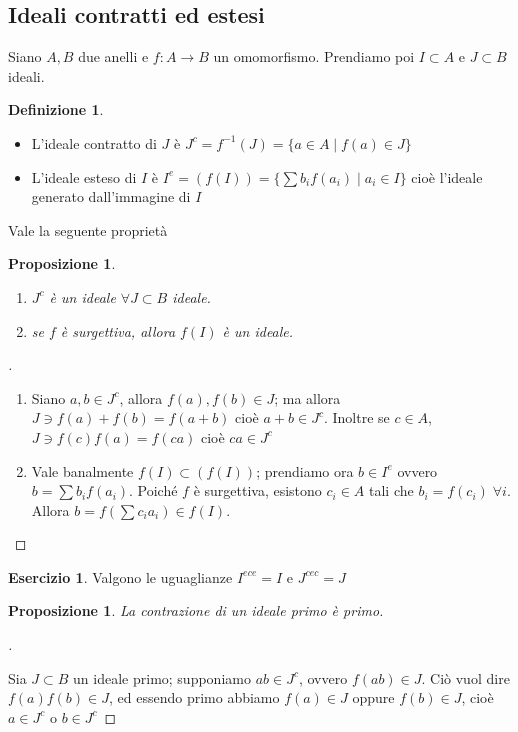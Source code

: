 \documentclass[a4paper,10pt]{article}
\theoremstyle{plain}
\newtheorem{prop}[thm]{Proposizione}
\theoremstyle{definition}
\newtheorem{defn}{Definizione}[section]
\newtheorem{es}{Esercizio}[section]
\newenvironment{myproof}[1][\proofname]{%
  \begin{proof}[#1]$ $\par\nobreak\ignorespaces
}{%
  \qedhere
  \end{proof}
}
\begin{document}
\subsection{Ideali contratti ed estesi}
Siano $A,B$ due anelli e $f:A\to B$ un omomorfismo. Prendiamo poi $I\subset A$ e $J\subset B$ ideali.\\
\begin{defn}
    $ $
    \begin{itemize}
        \item L'ideale contratto di $J$ è $J^c=f^{-1}(J)=\{ a\in A\mid f(a)\in J \}$
        \item L'ideale esteso di $I$ è $I^e=(f(I))=\{ \sum b_if(a_i)\mid a_i\in I \}$ cioè l'ideale generato dall'immagine di $I$
    \end{itemize}
\end{defn}

Vale la seguente proprietà
\begin{prop}
    $ $
    \begin{enumerate}
        \item $J^c$ è un ideale $\forall J\subset B$ ideale.
        \item se $f$ è surgettiva, allora $f(I)$ è un ideale.
    \end{enumerate}
\end{prop}
\begin{myproof}
    \begin{enumerate}
        \item Siano $a,b\in J^c$, allora $f(a),f(b)\in J$; ma allora $J\ni f(a)+f(b)=f(a+b)$ cioè $a+b\in J^c$. Inoltre se $c\in A$, $J\ni f(c)f(a)=f(ca)$ cioè $ca\in J^c$
        \item Vale banalmente $f(I)\subset (f(I))$; prendiamo ora $b\in I^e$ ovvero $b=\sum b_if(a_i)$. Poiché $f$ è surgettiva, esistono $c_i\in A$ tali che $b_i=f(c_i)\;\forall i$. Allora $b=f\left( \sum c_ia_i \right)\in f(I)$.
    \end{enumerate}
\end{myproof}

\begin{es}
    Valgono le uguaglianze $I^{ece}=I$ e $J^{cec}=J$
\end{es}

\begin{prop}
    La contrazione di un ideale primo è primo.
\end{prop}
\begin{myproof}
    Sia $J\subset B$ un ideale primo; supponiamo $ab\in J^c$, ovvero $f(ab)\in J$. Ciò vuol dire $f(a)f(b)\in J$, ed essendo primo abbiamo $f(a)\in J$ oppure $f(b)\in J$, cioè $a\in J^c$ o $b\in J^c$
\end{myproof}
\end{document}
